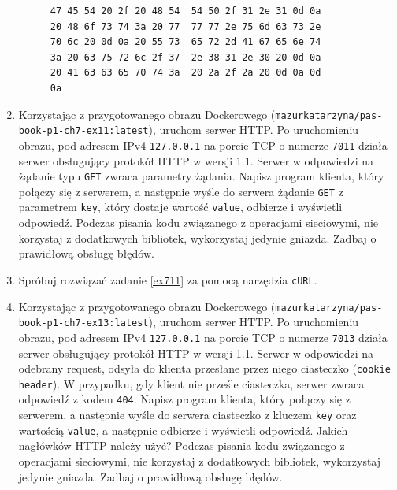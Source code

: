 \documentclass{article}
\begin{document}
\begin{enumerate}[label=\textbf{7.\arabic*}]
\begin{figure}[h!t!p!]
\centering
\begin{BVerbatim}
47 45 54 20 2f 20 48 54  54 50 2f 31 2e 31 0d 0a   
20 48 6f 73 74 3a 20 77  77 77 2e 75 6d 63 73 2e   
70 6c 20 0d 0a 20 55 73  65 72 2d 41 67 65 6e 74   
3a 20 63 75 72 6c 2f 37  2e 38 31 2e 30 20 0d 0a  
20 41 63 63 65 70 74 3a  20 2a 2f 2a 20 0d 0a 0d   
0a
\end{BVerbatim}
\end{figure}

\item \label{ex711} Korzystając z przygotowanego obrazu Dockerowego (\texttt{mazurkatarzyna/pas-book-p1-ch7-ex11:latest}), uruchom serwer HTTP.  Po uruchomieniu obrazu, pod adresem IPv4 \texttt{127.0.0.1} na porcie TCP o numerze \texttt{7011} działa serwer obsługujący protokół HTTP w wersji 1.1. Serwer w odpowiedzi na żądanie typu \texttt{GET} zwraca parametry żądania. Napisz program klienta, który połączy się z serwerem, a następnie wyśle do serwera żądanie \texttt{GET} z parametrem \texttt{key}, który dostaje wartość \texttt{value}, odbierze i wyświetli odpowiedź.  Podczas pisania kodu związanego z operacjami sieciowymi, nie korzystaj z dodatkowych bibliotek, wykorzystaj jedynie gniazda. Zadbaj o prawidłową obsługę błędów.


\item Spróbuj rozwiązać zadanie \ref{ex711} za pomocą narzędzia \texttt{cURL}. 

\item \label{ex713}  Korzystając z przygotowanego obrazu Dockerowego (\texttt{mazurkatarzyna/pas-book-p1-ch7-ex13:latest}), uruchom serwer HTTP.  Po uruchomieniu obrazu, pod adresem IPv4 \texttt{127.0.0.1} na porcie TCP o numerze \texttt{7013} działa serwer obsługujący protokół HTTP w wersji 1.1. Serwer w odpowiedzi na odebrany request, odsyła do klienta przesłane przez niego ciasteczko (\texttt{cookie header}). W przypadku, gdy klient nie prześle ciasteczka, serwer zwraca odpowiedź z kodem \texttt{404}. Napisz program klienta, który połączy się z serwerem, a następnie wyśle do serwera ciasteczko z kluczem \texttt{key} oraz wartością \texttt{value}, a następnie odbierze i wyświetli odpowiedź.   Jakich nagłówków HTTP należy użyć?  Podczas pisania kodu związanego z operacjami sieciowymi, nie korzystaj z dodatkowych bibliotek, wykorzystaj jedynie gniazda. Zadbaj o prawidłową obsługę błędów.


\end{enumerate}
\end{document}
